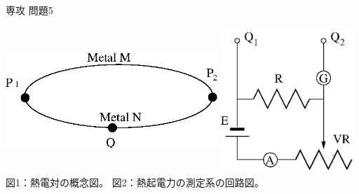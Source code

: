 \documentclass[fleqn]{jbook}
\begin{document}
\begin{question}{専攻 問題5}{}
\begin{subquestions}
\begin{subsubquestions}
\includegraphics[clip,height=55mm,width=80mm]{1998phy5-1-1.eps}
\hspace{10mm}
\includegraphics[clip,height=55mm,width=50mm]{1998phy5-1-2.eps}
\\
\hspace{25mm}
図1：熱電対の概念図。
\hspace{30mm}
図2：熱起電力の測定系の回路図。
\end{subsubquestions}
\end{subquestions}
\end{question}
\end{document}
